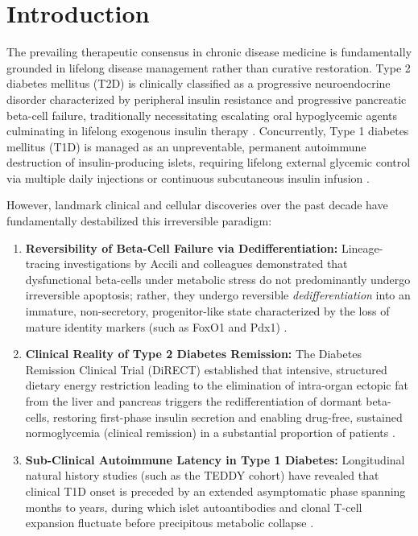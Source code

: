 \documentclass[11pt,a4paper]{article}
\begin{document}
\section{Introduction}

The prevailing therapeutic consensus in chronic disease medicine is fundamentally grounded in lifelong disease management rather than curative restoration. Type 2 diabetes mellitus (T2D) is clinically classified as a progressive neuroendocrine disorder characterized by peripheral insulin resistance and progressive pancreatic beta-cell failure, traditionally necessitating escalating oral hypoglycemic agents culminating in lifelong exogenous insulin therapy \cite{DeFronzo2009, Kahn2006}. Concurrently, Type 1 diabetes mellitus (T1D) is managed as an unpreventable, permanent autoimmune destruction of insulin-producing islets, requiring lifelong external glycemic control via multiple daily injections or continuous subcutaneous insulin infusion \cite{Eisenbarth1986, Atkinson2014}.

However, landmark clinical and cellular discoveries over the past decade have fundamentally destabilized this irreversible paradigm:
\begin{enumerate}
    \item \textbf{Reversibility of Beta-Cell Failure via Dedifferentiation:} Lineage-tracing investigations by Accili and colleagues demonstrated that dysfunctional beta-cells under metabolic stress do not predominantly undergo irreversible apoptosis; rather, they undergo reversible \emph{dedifferentiation} into an immature, non-secretory, progenitor-like state characterized by the loss of mature identity markers (such as FoxO1 and Pdx1) \cite{Talchai2012, Accili2019}.
    \item \textbf{Clinical Reality of Type 2 Diabetes Remission:} The Diabetes Remission Clinical Trial (DiRECT) established that intensive, structured dietary energy restriction leading to the elimination of intra-organ ectopic fat from the liver and pancreas triggers the redifferentiation of dormant beta-cells, restoring first-phase insulin secretion and enabling drug-free, sustained normoglycemia (clinical remission) in a substantial proportion of patients \cite{Lean2018, Taylor2018, Taylor2019}.
    \item \textbf{Sub-Clinical Autoimmune Latency in Type 1 Diabetes:} Longitudinal natural history studies (such as the TEDDY cohort) have revealed that clinical T1D onset is preceded by an extended asymptomatic phase spanning months to years, during which islet autoantibodies and clonal T-cell expansion fluctuate before precipitous metabolic collapse \cite{Ziegler2013, Insel2015}.
\end{enumerate}
\end{document}
